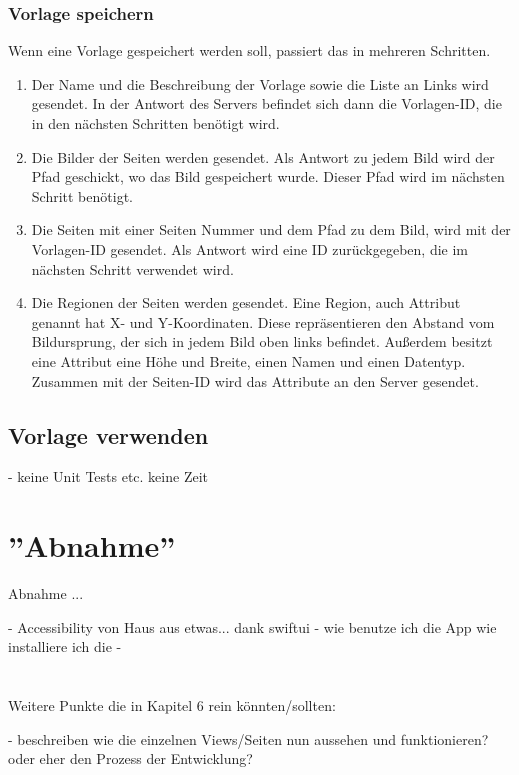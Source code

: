 \documentclass[nomenclature, oneside, 150]{HSMW-Thesis}
\begin{document}
			\subsubsection{Vorlage speichern}
			Wenn eine Vorlage gespeichert werden soll, passiert das in mehreren Schritten. 
			\begin{enumerate}
				\item Der Name und die Beschreibung der Vorlage sowie die Liste an Links wird gesendet. In der Antwort des Servers befindet sich dann die Vorlagen-ID, die in den nächsten Schritten benötigt wird. 
				\item Die Bilder der Seiten werden gesendet. Als Antwort zu jedem Bild wird der Pfad geschickt, wo das Bild gespeichert wurde. Dieser Pfad wird im nächsten Schritt benötigt.
				\item Die Seiten mit einer Seiten Nummer und dem Pfad zu dem Bild, wird mit der Vorlagen-ID gesendet. Als Antwort wird eine ID zurückgegeben, die im nächsten Schritt verwendet wird.
				\item Die Regionen der Seiten werden gesendet. Eine Region, auch Attribut genannt hat X- und Y-Koordinaten. Diese repräsentieren den Abstand vom Bildursprung, der sich in jedem Bild oben links befindet. Außerdem besitzt eine Attribut eine Höhe und Breite, einen Namen und einen Datentyp. Zusammen mit der Seiten-ID wird das Attribute an den Server gesendet.
			\end{enumerate}
		
		\subsection{Vorlage verwenden}
		

		
		- keine Unit Tests etc. keine Zeit
		
	\section{''Abnahme''}	
		Abnahme ... 
		
	- Accessibility 	von Haus aus etwas... dank swiftui
	- wie benutze ich die App wie installiere ich die
	- 
		\\ \\ \\
	Weitere Punkte die in Kapitel 6 rein könnten/sollten: 
	
	- beschreiben wie die einzelnen Views/Seiten nun aussehen und funktionieren? oder eher den Prozess der Entwicklung?
	
\end{document}
